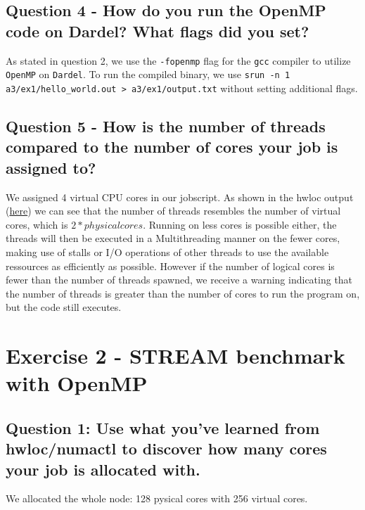 \documentclass[a4paper,10pt]{article}
\begin{document}
\subsection{Question 4 - How do you run the OpenMP code on Dardel? What flags did you set?}
As stated in question 2, we use the \verb|-fopenmp| flag for the \verb|gcc| compiler to utilize \verb|OpenMP| on \verb|Dardel|.
To run the compiled binary, we use \verb|srun -n 1 a3/ex1/hello_world.out > a3/ex1/output.txt| without setting additional flags.

\subsection{Question 5 - How is the number of threads compared to the number of cores your job is assigned to?}
We assigned 4 virtual CPU cores in our jobscript. As shown in the hwloc output (\href{https://github.com/paulmyr/DD2356-MethodsHPC/blob/master/3_open_mp/img/ex1/topology.svg}{here}) we can see that the number of threads resembles the number of virtual cores, which is $2 * physical cores$. Running on less cores is possible either, 
the threads will then be executed in a Multithreading manner on the fewer cores, making use of stalls or I/O operations of other threads to use the available ressources as efficiently as possible. However if the number of logical cores
is fewer than the number of threads spawned, we receive a warning indicating that the number of threads is greater than the number of cores to run the program on, but the code still executes.

\section{Exercise 2 - STREAM benchmark with OpenMP}
\subsection{Question 1: Use what you've learned from hwloc/numactl to discover how many cores your job is allocated with.}
We allocated the whole node: 128 pysical cores with 256 virtual cores.
\end{document}
